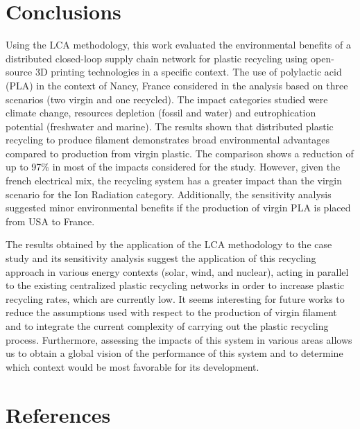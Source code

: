 \documentclass[12pt]{elsarticle} %
\begin{document}
\hypertarget{conclusions}{%
\section{Conclusions}\label{conclusions}}

Using the LCA methodology, this work evaluated the environmental benefits of a distributed closed-loop supply chain network for plastic recycling using open-source 3D printing technologies in a specific context.
The use of polylactic acid (PLA) in the context of Nancy, France considered in the analysis based on three scenarios (two virgin and one recycled).
The impact categories studied were climate change, resources depletion (fossil and water) and eutrophication potential (freshwater and marine).
The results shown that distributed plastic recycling to produce filament demonstrates broad environmental advantages compared to production from virgin plastic.
The comparison shows a reduction of up to 97\% in most of the impacts considered for the study.
However, given the french electrical mix, the recycling system has a greater impact than the virgin scenario for the Ion Radiation category.
Additionally, the sensitivity analysis suggested minor environmental benefits if the production of virgin PLA is placed from USA to France.

The results obtained by the application of the LCA methodology to the case study and its sensitivity analysis suggest the application of this recycling approach in various energy contexts (solar, wind, and nuclear), acting in parallel to the existing centralized plastic recycling networks in order to increase plastic recycling rates, which are currently low.
It seems interesting for future works to reduce the assumptions used with respect to the production of virgin filament and to integrate the current complexity of carrying out the plastic recycling process.
Furthermore, assessing the impacts of this system in various areas allows us to obtain a global vision of the performance of this system and to determine which context would be most favorable for its development.

\newpage

\hypertarget{references}{%
\section{References}\label{references}}
\end{document}
